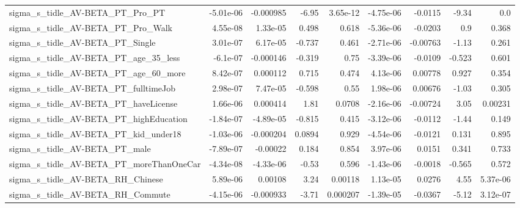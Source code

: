 \begin{tabular}{lrrrrrrrr}
sigma\_s\_tidle\_AV-BETA\_PT\_Pro\_PT                    &   -5.01e-06 &    -0.000985 &     -6.95 & 3.65e-12 &  -4.75e-06 &     -0.0115 &        -9.34 &           0.0 \\
sigma\_s\_tidle\_AV-BETA\_PT\_Pro\_Walk                  &    4.55e-08 &     1.33e-05 &     0.498 &    0.618 &  -5.36e-06 &     -0.0203 &          0.9 &         0.368 \\
sigma\_s\_tidle\_AV-BETA\_PT\_Single                    &    3.01e-07 &     6.17e-05 &    -0.737 &    0.461 &  -2.71e-06 &    -0.00763 &        -1.13 &         0.261 \\
sigma\_s\_tidle\_AV-BETA\_PT\_age\_35\_less               &    -6.1e-07 &    -0.000146 &    -0.319 &     0.75 &  -3.39e-06 &     -0.0109 &       -0.523 &         0.601 \\
sigma\_s\_tidle\_AV-BETA\_PT\_age\_60\_more               &    8.42e-07 &     0.000112 &     0.715 &    0.474 &   4.13e-06 &     0.00778 &        0.927 &         0.354 \\
sigma\_s\_tidle\_AV-BETA\_PT\_fulltimeJob               &    2.98e-07 &     7.47e-05 &    -0.598 &     0.55 &   1.98e-06 &     0.00676 &        -1.03 &         0.305 \\
sigma\_s\_tidle\_AV-BETA\_PT\_haveLicense               &    1.66e-06 &     0.000414 &      1.81 &   0.0708 &  -2.16e-06 &    -0.00724 &         3.05 &       0.00231 \\
sigma\_s\_tidle\_AV-BETA\_PT\_highEducation             &   -1.84e-07 &    -4.89e-05 &    -0.815 &    0.415 &  -3.12e-06 &     -0.0112 &        -1.44 &         0.149 \\
sigma\_s\_tidle\_AV-BETA\_PT\_kid\_under18               &   -1.03e-06 &    -0.000204 &    0.0894 &    0.929 &  -4.54e-06 &     -0.0121 &        0.131 &         0.895 \\
sigma\_s\_tidle\_AV-BETA\_PT\_male                      &   -7.89e-07 &     -0.00022 &     0.184 &    0.854 &   3.97e-06 &      0.0151 &        0.341 &         0.733 \\
sigma\_s\_tidle\_AV-BETA\_PT\_moreThanOneCar            &   -4.34e-08 &    -4.33e-06 &     -0.53 &    0.596 &  -1.43e-06 &     -0.0018 &       -0.565 &         0.572 \\
sigma\_s\_tidle\_AV-BETA\_RH\_Chinese                   &    5.89e-06 &      0.00108 &      3.24 &  0.00118 &   1.13e-05 &      0.0276 &         4.55 &      5.37e-06 \\
sigma\_s\_tidle\_AV-BETA\_RH\_Commute                   &   -4.15e-06 &    -0.000933 &     -3.71 & 0.000207 &  -1.39e-05 &     -0.0367 &        -5.12 &      3.12e-07 \\

\end{tabular}
